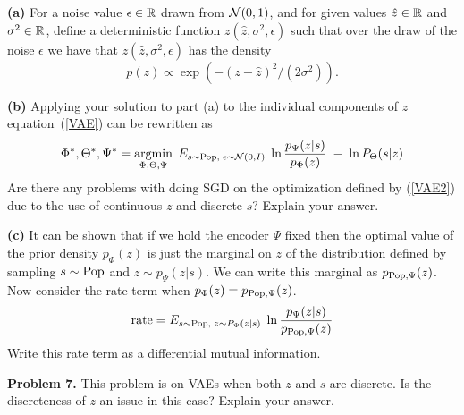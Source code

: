 \documentclass{article}
\newcommand{\solution}[1]{}
\begin{document}
{\bf (a)} For a noise value $\epsilon \in \mathbb{R}$ drawn from ${\cal N}(0,1)$,
and for given values $\hat{z} \in \mathbb{R}$ and $\sigma^2 \in \mathbb{R}$, define a deterministic function $z(\hat{z},\sigma^2,\epsilon)$ such that over the draw of the noise
$\epsilon$ we have that $z(\hat{z},\sigma^2,\epsilon)$ has the density
$$p(z) \propto \exp(-(z-\hat{z})^2/(2\sigma^2)).$$

\solution{$z(\hat{z},\sigma^2,\epsilon) = \hat{z} + \sigma\epsilon$}

{\bf (b)} Applying your solution to part (a) to the individual components of $z$ equation~(\ref{VAE}) can be rewritten as
\begin{equation}
    \Phi^*,\Theta^*,\Psi^* = \operatorname*{argmin}_{\Phi,\Theta,\Psi}\;E_{s \sim \mathrm{Pop},\;\epsilon \sim {\cal N}(0,I)}\;\ln\frac{p_\Psi(z|s)}{p_\Phi(z)} \;-\; \ln P_\Theta(s|z)
    \label{VAE2}
\end{equation}
Are there any problems with doing SGD on the optimization defined by (\ref{VAE2}) due to the use of continuous $z$ and discrete $s$?  Explain your answer.

\solution{There are no problems here.
  Since $P(s|z)$ is a computable and $z$ is continuous we can compute $z.\grad$ which can then passed back to the encoder $\Psi$
  through the computation of $z(\hat{z}_\Psi(y),\Sigma_\Psi(y),\epsilon)$. We get a clear advantage of VAEs over GANs for $s$ discrete.}

{\bf (c)} It can be shown that if we hold the encoder $\Psi$ fixed then the optimal value of the prior density $p_\Phi(z)$ is just the marginal on $z$ of the distribution defined
by sampling $s \sim \mathrm{Pop}$ and $z \sim p_\Psi(z|s)$.  We can write this marginal as $p_{\mathrm{Pop},\Psi}(z)$.  Now consider the rate term when $p_\Phi(z) = p_{\mathrm{Pop},\Psi}(z)$.
$$\mathrm{rate} = E_{s \sim \mathrm{Pop},\;z \sim P_\Psi(z|s)}\;\ln\frac{p_\Psi(z|s)}{p_{\mathrm{Pop},\Psi}(z)}$$
Write this rate term as a differential mutual information.

\solution{
  $$\mathrm{rate} = I_{\pop,\Psi}(s,z)$$
  This has a channel capacity interpretation.  It is the information capacity (information rate) of the communication channel that takes input $y$ to output $z$.
  This is typically a nice finite number of bits (or nats) even for continuous densities.  Adding noise to $\hat{z}_\Psi(y)$ intuitively limits its precision
  and limits the information that $z$ carries about $s$.
}

\bigskip
{\bf Problem 7.} This problem is on VAEs when both $z$ and $s$ are discrete.
Is the discreteness of $z$ an issue in this case?  Explain your answer.
\end{document}
